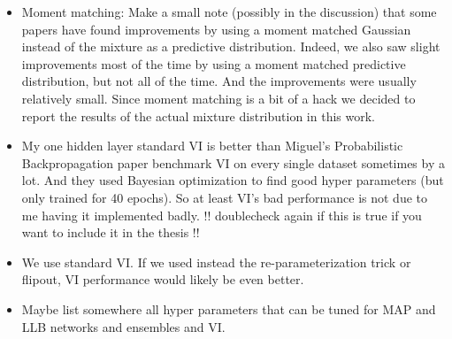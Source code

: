 \documentclass[11pt, A4, twoside]{report}
\begin{document}
\begin{itemize}
  \item Moment matching: Make a small note (possibly in the discussion) that some papers have found improvements by using a moment matched Gaussian instead of the mixture as a predictive distribution. Indeed, we also saw slight improvements most of the time by using a moment matched predictive distribution, but not all of the time. And the improvements were usually relatively small. Since moment matching is a bit of a hack we decided to report the results of the actual mixture distribution in this work.
  \item My one hidden layer standard VI is better than Miguel's Probabilistic Backpropagation paper benchmark VI on every single dataset sometimes by a lot. And they used Bayesian optimization to find good hyper parameters (but only trained for 40 epochs). So at least VI's bad performance is not due to me having it implemented badly. !! doublecheck again if this is true if you want to include it in the thesis !!
  \item We use standard VI. If we used instead the re-parameterization trick or flipout, VI performance would likely be even better.
  \item Maybe list somewhere all hyper parameters that can be tuned for MAP and LLB networks and ensembles and VI.
\end{itemize}

\printbibliography


\begin{appendices}

\end{appendices}
\end{document}
